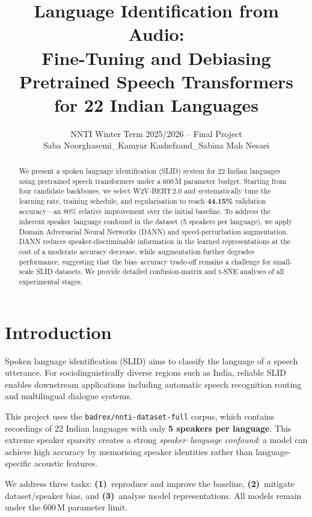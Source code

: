 \documentclass[11pt]{article}
\title{Language Identification from Audio:\\Fine-Tuning and Debiasing Pretrained Speech Transformers\\for 22 Indian Languages}
\author{NNTI Winter Term 2025/2026 – Final Project\\ Saba Noorghasemi\_Kamyar Kashefzand\_Sabina Mah Nesaei}
\begin{document}
\maketitle

\begin{abstract}
We present a spoken language identification (SLID) system for 22 Indian languages using pretrained speech transformers under a \mbox{600\,M} parameter budget.
Starting from four candidate backbones, we select \textsc{W2V-BERT\,2.0} and systematically tune the learning rate, training schedule, and regularisation to reach \textbf{44.15\%} validation accuracy—an 80\% relative improvement over the initial baseline.
To address the inherent speaker–language confound in the dataset (5 speakers per language), we apply Domain Adversarial Neural Networks (DANN) and speed-perturbation augmentation.
DANN reduces speaker-discriminable information in the learned representations at the cost of a moderate accuracy decrease, while augmentation further degrades performance, suggesting that the bias–accuracy trade-off remains a challenge for small-scale SLID datasets.
We provide detailed confusion-matrix and t-SNE analyses of all experimental stages.
\end{abstract}

\section{Introduction}
\label{sec:intro}

Spoken language identification (SLID) aims to classify the language of a speech utterance.
For sociolinguistically diverse regions such as India, reliable SLID enables downstream applications including automatic speech recognition routing and multilingual dialogue systems.

This project uses the \texttt{badrex/nnti-dataset-full} corpus, which contains recordings of 22 Indian languages with only \textbf{5 speakers per language}.
This extreme speaker sparsity creates a strong \emph{speaker–language confound}: a model can achieve high accuracy by memorising speaker identities rather than language-specific acoustic features.

We address three tasks:
\textbf{(1)}~reproduce and improve the baseline,
\textbf{(2)}~mitigate dataset/speaker bias, and
\textbf{(3)}~analyse model representations.
All models remain under the 600\,M parameter limit.
\end{document}
